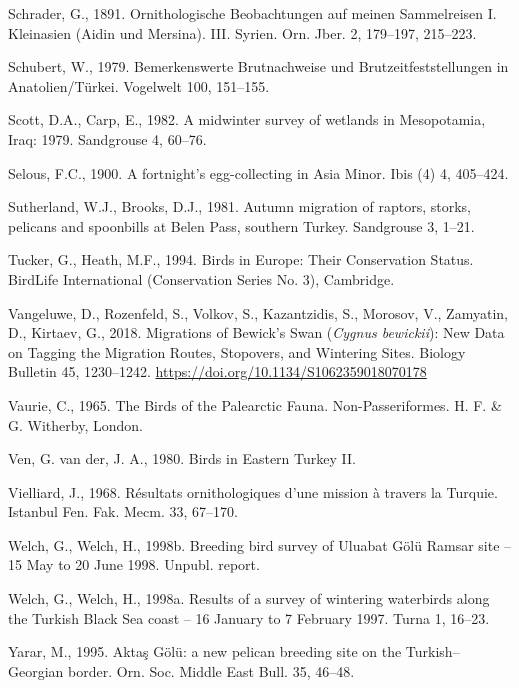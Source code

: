 \documentclass[
  a4paper,
  DIV=11,
  numbers=noendperiod]{scrartcl}
\newlength{\cslhangindent}
\newenvironment{CSLReferences}[2] %
 {\begin{list}{}{%
  \setlength{\itemindent}{0pt}
  \setlength{\leftmargin}{0pt}
  \setlength{\parsep}{0pt}
  \ifodd #1
   \setlength{\leftmargin}{\cslhangindent}
   \setlength{\itemindent}{-1\cslhangindent}
  \fi
  \setlength{\itemsep}{#2\baselineskip}}}
 {\end{list}}
\begin{document}
\begin{CSLReferences}{1}{0}
Schrader, G., 1891. {Ornithologische Beobachtungen auf meinen
Sammelreisen I. Kleinasien (Aidin und Mersina). III. Syrien}. Orn. Jber.
2, 179--197, 215--223.

Schubert, W., 1979. {Bemerkenswerte Brutnachweise und
Brutzeitfeststellungen in Anatolien/Türkei}. Vogelwelt 100, 151--155.

Scott, D.A., Carp, E., 1982. {A midwinter survey of wetlands in
Mesopotamia, Iraq: 1979}. Sandgrouse 4, 60--76.

Selous, F.C., 1900. {A fortnight's egg-collecting in Asia Minor}. Ibis
(4) 4, 405--424.

Sutherland, W.J., Brooks, D.J., 1981. {Autumn migration of raptors,
storks, pelicans and spoonbills at Belen Pass, southern Turkey}.
Sandgrouse 3, 1--21.

Tucker, G., Heath, M.F., 1994. {Birds in Europe: Their Conservation
Status}. BirdLife International (Conservation Series No. 3), Cambridge.

Vangeluwe, D., Rozenfeld, S., Volkov, S., Kazantzidis, S., Morosov, V.,
Zamyatin, D., Kirtaev, G., 2018. {Migrations of Bewick's Swan
(\emph{Cygnus bewickii}): New Data on Tagging the Migration Routes,
Stopovers, and Wintering Sites}. Biology Bulletin 45, 1230--1242.
\url{https://doi.org/10.1134/S1062359018070178}

Vaurie, C., 1965. {The Birds of the Palearctic Fauna.
Non-Passeriformes}. H. F. \& G. Witherby, London.

Ven, G. van der, J. A., 1980. {Birds in Eastern Turkey II}.

Vielliard, J., 1968. {Résultats ornithologiques d'une mission à travers
la Turquie}. Istanbul Fen. Fak. Mecm. 33, 67--170.

Welch, G., Welch, H., 1998b. {Breeding bird survey of Uluabat Gölü
Ramsar site -- 15 May to 20 June 1998}. Unpubl. report.

Welch, G., Welch, H., 1998a. {Results of a survey of wintering
waterbirds along the Turkish Black Sea coast -- 16 January to 7 February
1997}. Turna 1, 16--23.

Yarar, M., 1995. {Aktaş Gölü: a new pelican breeding site on the
Turkish--Georgian border}. Orn. Soc. Middle East Bull. 35, 46--48.

\end{CSLReferences}
\end{document}
